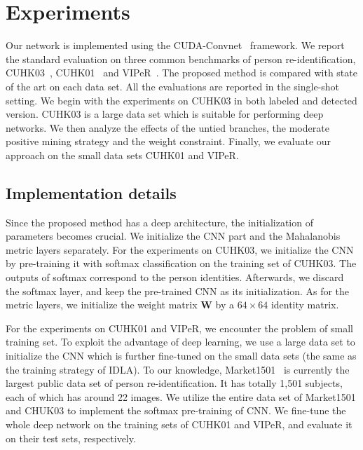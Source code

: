 \documentclass[10pt,twocolumn,letterpaper]{article}
\begin{document}
\section{Experiments}
\label{section_Experiments}

Our network is implemented using the CUDA-Convnet~\cite{krizhevsky2012imagenet} framework.
We report the standard evaluation on three common benchmarks of person re-identification, \ie CUHK03~\cite{li2014deepreid}, CUHK01~\cite{li2012human} and VIPeR~\cite{gray2007evaluating}.
The proposed method is compared with state of the art on each data set.
All the evaluations are reported in the single-shot setting.
We begin with the experiments on CUHK03 in both labeled and detected version.
CUHK03 is a large data set which is suitable for performing deep networks.
We then analyze the effects of the untied branches, the moderate positive mining strategy and the weight constraint.
Finally, we evaluate our approach on the small data sets CUHK01 and VIPeR.

\subsection{Implementation details}
\label{section_Initialization}

Since the proposed method has a deep architecture, the initialization of parameters becomes crucial.
We initialize the CNN part and the Mahalanobis metric layers separately.
For the experiments on CUHK03, we initialize the CNN by pre-training it with softmax classification on the training set of CUHK03.
The outputs of softmax correspond to the person identities. Afterwards, we discard the softmax layer, and keep the pre-trained CNN as its initialization.
As for the metric layers, we initialize the weight matrix $\textbf{W}$ by a $64 \times 64$ identity matrix.

For the experiments on CUHK01 and VIPeR, we encounter the problem of small training set.
To exploit the advantage of deep learning, we use a large data set to initialize the CNN which is further fine-tuned on the small data sets (the same as the training strategy of IDLA\cite{ahmed2015improved}).
To our knowledge, Market1501~\cite{zheng2015scalable} is currently the largest public data set of person re-identification. It has totally 1,501 subjects, each of which has around 22 images.
We utilize the entire data set of Market1501 and CHUK03 to implement the softmax pre-training of CNN.
We fine-tune the whole deep network on the training sets of CUHK01 and VIPeR, and evaluate it on their test sets, respectively.
\end{document}
